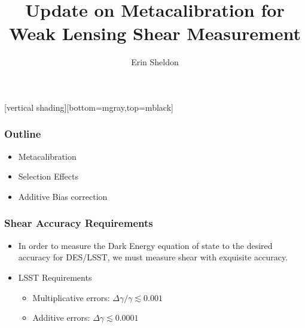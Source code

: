 \documentclass{beamer}
\title{Update on Metacalibration for Weak Lensing Shear Measurement}
\author{Erin Sheldon}
\institute{Brookhaven National Laboratory}
\begin{document}
\frame{\titlepage}


[vertical shading][bottom=mgray,top=mblack]

\frame
{
    \frametitle{Outline}

 
    \begin{itemize}

        \item Metacalibration

        \item Selection Effects

        \item Additive Bias correction

    \end{itemize}

}

\frame
{
    \frametitle{Shear Accuracy Requirements}

 
    \begin{itemize}

        \item In order to measure the Dark Energy equation of state
            to the desired accuracy for DES/LSST, we must measure
            shear with exquisite accuracy.

        \item LSST Requirements
            \begin{itemize}
                \item Multiplicative errors: {\color{gold} $\Delta \gamma/\gamma \lesssim 0.001$}
                \item Additive errors: {\color{brightred} $\Delta \gamma \lesssim 0.0001$}
            \end{itemize}


    \end{itemize}

}
\end{document}
